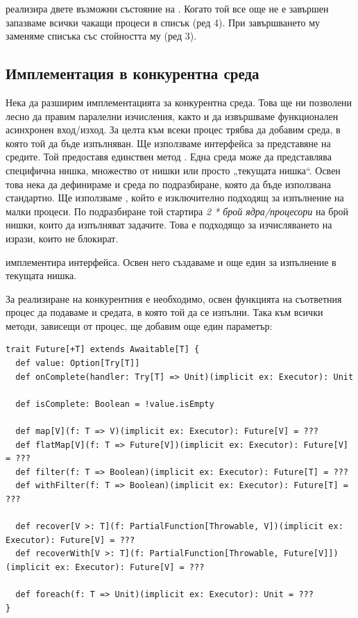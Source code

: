 

 реализира двете възможни състояние на . Когато той все още не е завършен запазваме всички чакащи процеси в списък (ред 4). При завършването му заменяме списъка със стойността му (ред 3).

\subsection{Имплементация в конкурентна среда}

Нека да разширим имплементацията за конкурентна среда. Това ще ни позволени лесно да правим паралелни изчисления, както и да извършваме функционален асинхронен вход/изход. За целта към всеки процес трябва да добавим среда, в която той да бъде изпълняван. Ще използваме интерфейса  за представяне на средите. Той предоставя единствен метод . Една среда може да представлява специфична нишка, множество от нишки или просто „текущата нишка“. Освен това нека да дефинираме и среда по подразбиране, която да бъде използвана стандартно. Ще използваме , който е изключително подходящ за изпълнение на малки процеси. По подразбиране той стартира \emph{2 * брой ядра/процесори} на брой нишки, които да изпълняват задачите. Това е подходящо за изчисляването на изрази, които не блокират.



 имплементира  интерфейса. Освен него създаваме и още един  за изпълнение в текущата нишка.

За реализиране на конкурентния  е необходимо, освен функцията на съответния процес да подаваме и средата, в която той да се изпълни. Така към всички методи, зависещи от процес, ще добавим още един параметър:

\begin{lstlisting}[style=listing, caption={Конкурентен \englishterm{future}}]
trait Future[+T] extends Awaitable[T] {
  def value: Option[Try[T]]
  def onComplete(handler: Try[T] => Unit)(implicit ex: Executor): Unit

  def isComplete: Boolean = !value.isEmpty

  def map[V](f: T => V)(implicit ex: Executor): Future[V] = ???
  def flatMap[V](f: T => Future[V])(implicit ex: Executor): Future[V] = ???
  def filter(f: T => Boolean)(implicit ex: Executor): Future[T] = ???
  def withFilter(f: T => Boolean)(implicit ex: Executor): Future[T] = ???

  def recover[V >: T](f: PartialFunction[Throwable, V])(implicit ex: Executor): Future[V] = ???
  def recoverWith[V >: T](f: PartialFunction[Throwable, Future[V]])(implicit ex: Executor): Future[V] = ???

  def foreach(f: T => Unit)(implicit ex: Executor): Unit = ???
}
\end{lstlisting}


